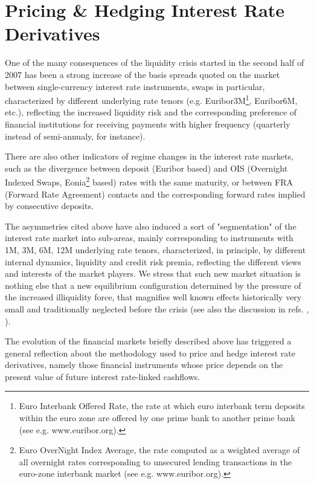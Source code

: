\documentclass[11pt,reqno]{amsart}
\begin{document}
\section{\label{SecPricing}Pricing \& Hedging Interest Rate Derivatives}
One of the many consequences of the liquidity crisis started in the second half of 2007 has been a strong increase of the basis spreads quoted on the market between single-currency interest rate instruments, swaps in particular, characterized by different underlying rate tenors (e.g. Euribor3M\footnote{Euro Interbank Offered Rate, the rate at which euro interbank term deposits within the euro zone are offered by one prime bank to another prime bank (see e.g. www.euribor.org).}, Euribor6M, etc.), reflecting the increased liquidity risk and the corresponding preference of financial institutions for receiving payments with higher frequency (quarterly instead of semi-annualy, for instance).
\par
There are also other indicators of regime changes in the interest rate markets, such as the divergence between deposit (Euribor based) and OIS (Overnight Indexed Swaps, Eonia\footnote{Euro OverNight Index Average, the rate computed as a weighted average of all overnight rates corresponding to unsecured lending transactions in the euro-zone interbank market (see e.g. www.euribor.org).} based) rates with the same maturity, or between FRA (Forward Rate Agreement) contacts and the corresponding forward rates implied by consecutive deposits.
\par
The asymmetries cited above have also induced a sort of "segmentation" of the interest rate market into sub-areas, mainly corresponding to instruments with 1M, 3M, 6M, 12M underlying rate tenors, characterized, in principle, by different internal dynamics, liquidity and credit risk premia, reflecting the different views and interests of the market players. We stress that such new market situation is nothing else that a new equilibrium configuration determined by the pressure of the increased illiquidity force, that magnifies well known effects historically very small and traditionally neglected before the crisis (see also the discussion in refs. \cite{Mor08}, \cite{Mer09}).
\par
The evolution of the financial markets briefly described above has triggered a general reflection about the methodology used to price and hedge interest rate derivatives, namely those financial instruments whose price depends on the present value of future interest rate-linked cashflows.
\end{document}
